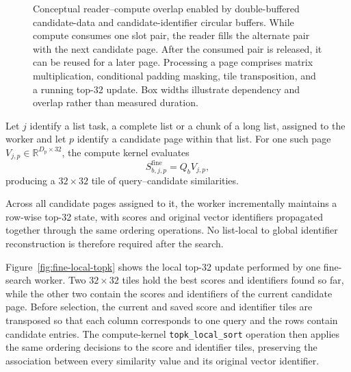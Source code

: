 \begin{figure}[htbp]
{%
}
\caption{Conceptual reader--compute overlap enabled by double-buffered
candidate-data and candidate-identifier circular buffers. While compute
consumes one slot pair, the reader fills the alternate pair with the next
candidate page. After the consumed pair is released, it can be reused for a
later page. Processing a page comprises matrix multiplication, conditional
padding masking, tile transposition, and a running top-32 update. Box widths
illustrate dependency and overlap rather than measured duration.}
\label{fig:fine-reader-compute-overlap}
\end{figure}

Let \(j\) identify a list task, a complete list or a chunk of a long list, assigned to the worker and let \(p\) identify a candidate page within that list. For one such page \(V_{j,p}\in\mathbb{R}^{D_{\mathrm{p}}\times32}\), the compute kernel evaluates
\begin{equation}
S^{\mathrm{fine}}_{b,j,p}=Q_bV_{j,p},
\label{eq:fine-search}
\end{equation}
producing a \(32\times32\) tile of query--candidate similarities.

Across all candidate pages assigned to it, the worker incrementally maintains a row-wise top-32 state, with scores and original vector identifiers propagated together through the same ordering operations. No list-local to global identifier reconstruction is therefore required after the search.

Figure~\ref{fig:fine-local-topk} shows the local top-32 update performed by one fine-search worker. Two \(32\times32\) tiles hold the best scores and identifiers found so far, while the other two contain the scores and identifiers of the current candidate page. Before selection, the current and saved score and identifier tiles are transposed so that each column corresponds to one query and the rows contain candidate entries. The compute-kernel \texttt{topk\_local\_sort} operation then applies the same ordering decisions to the score and identifier tiles, preserving the association between every similarity value and its original vector identifier.

